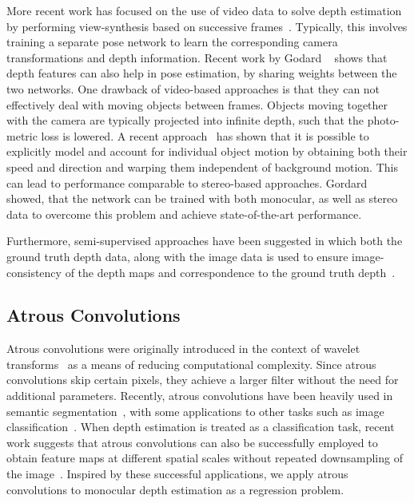 More recent work has focused on the use of video data to solve depth estimation by performing view-synthesis based on successive frames~\cite{Wang2017,Casser2018,Godard2018}.
Typically, this involves training a separate pose network to learn the corresponding camera transformations and depth information.
Recent work by Godard \etal~\cite{Godard2018} shows that depth features can also help in pose estimation, by sharing weights between the two networks.  
One drawback of video-based approaches is that they can not effectively deal with moving objects between frames.
Objects moving together with the camera are typically projected into infinite depth, such that the photo-metric loss is lowered.
A recent approach~\cite{Casser2018} has shown that it is possible to explicitly model and account for individual object motion by obtaining both their speed and direction and warping them independent of background motion.
This can lead to performance comparable to stereo-based approaches.
Gordard \etal~\cite{Godard2018} showed, that the network can be trained with both monocular, as well as stereo data to overcome this problem and achieve state-of-the-art performance.

Furthermore, semi-supervised approaches have been suggested in which both the ground truth depth data, along with the image data is used to ensure image-consistency of the depth maps and correspondence to the ground truth depth~\cite{DBLP:journals/corr/KuznietsovSL17}. 

\subsection{Atrous Convolutions}


Atrous convolutions were originally introduced in the context of wavelet transforms~\cite{holschneider1990wavelet} as a means of reducing computational complexity. Since atrous convolutions skip certain pixels, they achieve a larger filter without the need for additional parameters.
Recently, atrous convolutions have been heavily used in semantic segmentation~\cite{chen2018deeplab, chen2018encoder, wang2018understanding, YuKoltun2016}, with some applications to other tasks such as image classification~\cite{Yu_2017_CVPR}.
When depth estimation is treated as a classification task, recent work suggests that atrous convolutions can also be successfully employed to obtain feature maps at different spatial scales without repeated downsampling of the image~\cite{Fu2018,Chen2019}. 
Inspired by these successful applications, we apply atrous convolutions to monocular depth estimation as a regression problem.